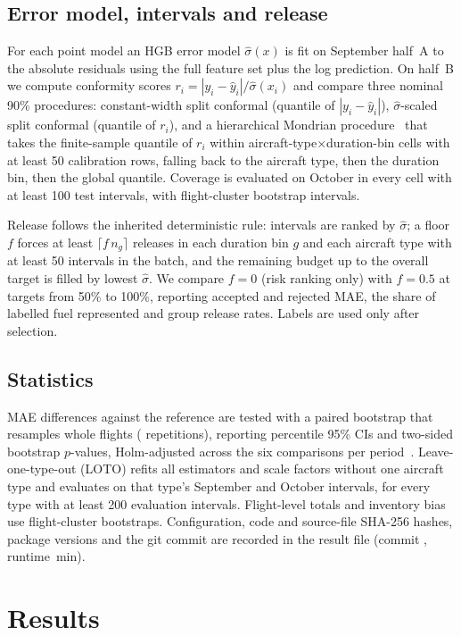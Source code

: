 \documentclass[runningheads]{llncs}
\begin{document}
\subsection{Error model, intervals and release}
For each point model an HGB error model $\hat\sigma(x)$ is fit on September half~A to the absolute residuals using the full feature set plus the log prediction. On half~B we compute conformity scores $r_i=|y_i-\hat y_i|/\hat\sigma(x_i)$ and compare three nominal 90\% procedures: constant-width split conformal (quantile of $|y_i-\hat y_i|$), $\hat\sigma$-scaled split conformal (quantile of $r_i$), and a hierarchical Mondrian procedure~\cite{vovk2012mondrian} that takes the finite-sample quantile of $r_i$ within aircraft-type$\times$duration-bin cells with at least 50 calibration rows, falling back to the aircraft type, then the duration bin, then the global quantile. Coverage is evaluated on October in every cell with at least 100 test intervals, with flight-cluster bootstrap intervals.

Release follows the inherited deterministic rule: intervals are ranked by $\hat\sigma$; a floor $f$ forces at least $\lceil f\,n_g\rceil$ releases in each duration bin $g$ and each aircraft type with at least 50 intervals in the batch, and the remaining budget up to the overall target is filled by lowest $\hat\sigma$. We compare $f=0$ (risk ranking only) with $f=0.5$ at targets from 50\% to 100\%, reporting accepted and rejected MAE, the share of labelled fuel represented and group release rates. Labels are used only after selection.

\subsection{Statistics}
MAE differences against the reference are tested with a paired bootstrap that resamples whole flights (\bootReps{} repetitions), reporting percentile 95\% CIs and two-sided bootstrap $p$-values, Holm-adjusted across the six comparisons per period~\cite{holm1979}. Leave-one-type-out (LOTO) refits all estimators and scale factors without one aircraft type and evaluates on that type's September and October intervals, for every type with at least 200 evaluation intervals. Flight-level totals and inventory bias use flight-cluster bootstraps. Configuration, code and source-file SHA-256 hashes, package versions and the git commit are recorded in the result file (commit \texttt{\gitCommit}, runtime \runtimeMin{}\,min).

\section{Results}\label{sec:results}
\end{document}
